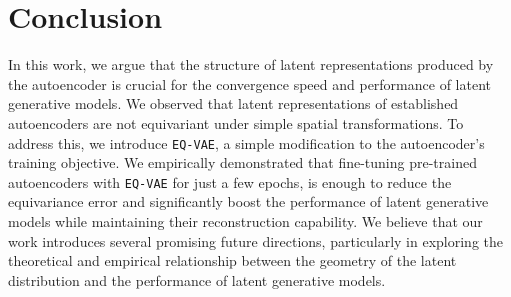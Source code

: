 \section{Conclusion}
\label{sec:conclusion}
In this work, we argue that the structure of latent representations produced by the autoencoder is crucial for the convergence speed and performance of latent generative models.
We observed that latent representations of established autoencoders are not equivariant under simple spatial transformations. To address this, we introduce \texttt{EQ-VAE}, a simple modification to the autoencoder's training objective. We empirically demonstrated that fine-tuning pre-trained autoencoders with \texttt{EQ-VAE} for just a few epochs, is enough to reduce the equivariance error and significantly boost the performance of latent generative models while maintaining their reconstruction capability. We believe that our work introduces several promising future directions, particularly in exploring the theoretical and empirical relationship between the geometry of the latent distribution and the performance of latent generative models.